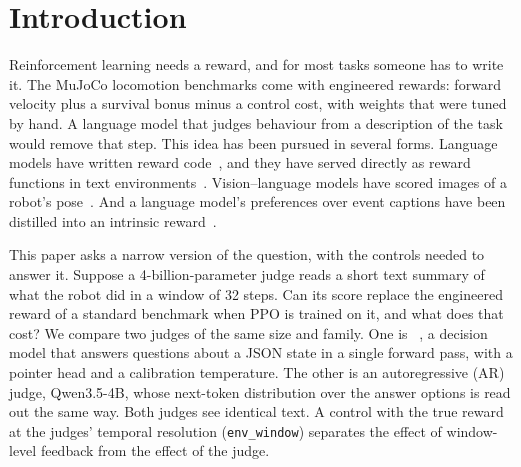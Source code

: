 
\section{Introduction}\label{sec:intro}

Reinforcement learning needs a reward, and for most tasks someone has to write it. The MuJoCo locomotion benchmarks
come with engineered rewards: forward velocity plus a survival bonus minus a control cost, with weights that were tuned
by hand. A language model that judges behaviour from a description of the task would remove that step. This idea has
been pursued in several forms. Language models have written reward code~\cite{yu2023language,ma2024eureka}, and they have
served directly as reward functions in text environments~\cite{kwon2023reward}. Vision--language models have scored
images of a robot's pose~\cite{rocamonde2024vlm}. And a language model's preferences over event captions have been
distilled into an intrinsic reward~\cite{klissarov2024motif}.

This paper asks a narrow version of the question, with the controls needed to answer it. Suppose a 4-billion-parameter
judge reads a short text summary of what the robot did in a window of 32 steps. Can its score replace the engineered
reward of a standard benchmark when PPO is trained on it, and what does that cost? We compare two judges of the same
size and family. One is \kev{}~\cite{kev4b}, a decision model that answers questions about a JSON state in a single
forward pass, with a pointer head and a calibration temperature. The other is an autoregressive (AR) judge,
Qwen3.5-4B, whose next-token distribution over the answer options is read out the same way. Both judges see identical
text. A control with the true reward at the judges' temporal resolution (\texttt{env\_window}) separates the effect of
window-level feedback from the effect of the judge.


